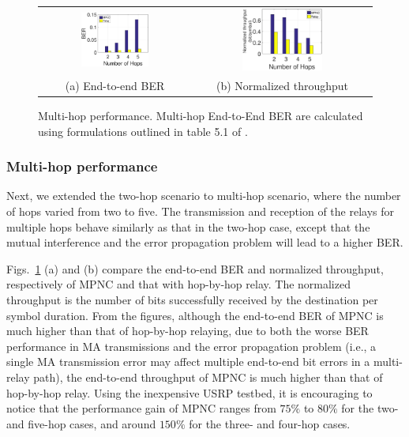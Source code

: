 \begin{figure} [th] 
\centering
\begin{tabular}{cc}
   \hspace*{-12pt} \includegraphics[width=0.47\textwidth]{figures/ber_bar_160}&
   \hspace*{-12pt}\includegraphics[width=0.47\textwidth]{figures/th_bar_160}\\
      \hspace*{-12pt} (a) End-to-end BER &
 \hspace*{-12pt} (b) Normalized throughput
      \end{tabular}
       \caption{Multi-hop performance. Multi-hop End-to-End BER are calculated using formulations outlined in table 5.1 of \cite{zhang2017cross}.} %
    \label{fig:experiment_ber}
\end{figure}

\subsubsection{Multi-hop performance}
Next, we extended the two-hop scenario to multi-hop scenario, where the number of hops varied from two to five. The transmission and reception of the relays for multiple hops behave similarly as that in the two-hop case, except that the mutual interference  and the error propagation problem will lead to a higher BER.

Figs.~\ref{fig:experiment_ber} (a) and (b) compare the end-to-end BER and normalized throughput, respectively of MPNC and that with hop-by-hop relay. 
The normalized throughput is the number of bits successfully received by the destination per symbol duration. 
From the figures, although the end-to-end BER of MPNC is much higher than that of hop-by-hop relaying, due to both the worse BER performance in MA transmissions and the error propagation problem (i.e., a single MA transmission error may affect multiple end-to-end bit errors in a multi-relay path),  the end-to-end throughput of MPNC is much higher
than that of hop-by-hop relay. Using the inexpensive USRP testbed, it is encouraging to notice that the performance gain of MPNC ranges from $75\%$ to $80\%$ for the two- and five-hop cases, and around $150\%$ for the three- and four-hop cases. 


